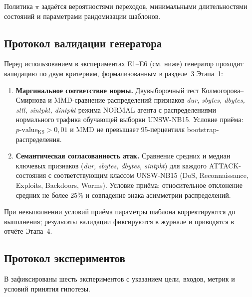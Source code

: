 Политика \(\pi\) задаётся вероятностями переходов, минимальными длительностями
состояний и параметрами рандомизации шаблонов.

\subsection{Протокол валидации генератора}

Перед использованием в экспериментах E1--E6 (см. ниже) генератор проходит
валидацию по двум критериям, формализованным в разделе~3 Этапа~1:

\begin{enumerate}
    \item \textbf{Маргинальное соответствие нормы.} Двувыборочный тест
    Колмогорова--Смирнова и MMD-сравнение распределений признаков
    \emph{dur, sbytes, dbytes, sttl, sintpkt, dintpkt} режима NORMAL агента
    с распределениями нормального трафика обучающей выборки UNSW-NB15.
    Условие приёма: $p\text{-value}_{\text{KS}} > 0{,}01$ и MMD не
    превышает 95-перцентиля bootstrap-распределения.
    \item \textbf{Семантическая согласованность атак.} Сравнение средних и
    медиан ключевых признаков (\emph{dur, sbytes, dbytes, sintpkt}) для
    каждого ATTACK-состояния с соответствующим классом UNSW-NB15
    (DoS, Reconnaissance, Exploits, Backdoors, Worms). Условие приёма:
    относительное отклонение средних не более 25\% и совпадение знака
    асимметрии распределений.
\end{enumerate}

При невыполнении условий приёма параметры шаблона корректируются до
выполнения; результаты валидации фиксируются в журнале и приводятся в
отчёте Этапа~4.

\subsection{Протокол экспериментов}

В  зафиксированы шесть экспериментов с указанием
цели, входов, метрик и условий принятия гипотезы.

